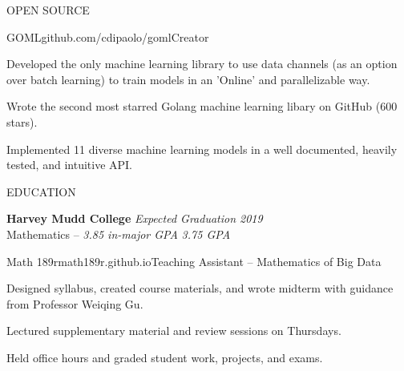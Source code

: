 \documentclass{resume} %
\begin{document}

\begin{rSection}{OPEN SOURCE}

\begin{rSubsection}{GOML}{\textsf{github.com/cdipaolo/goml}}{Creator}

\item Developed the only machine learning library to use data channels (as an option over batch learning) to train models in an 'Online' and parallelizable way.
\item Wrote the second most starred Golang machine learning libary on GitHub (600 stars).
\item Implemented 11 diverse machine learning models in a well documented, heavily tested, and intuitive API.
\end{rSubsection}

\end{rSection}



\begin{rSection}{EDUCATION}

{\bf Harvey Mudd College} \hfill {\em Expected Graduation 2019} \\ 
Mathematics -- {\em 3.85 in-major GPA} \hfill {\em 3.75 GPA}\\

\begin{rSubsection}{Math 189r}{\textsf{math189r.github.io}}{Teaching Assistant -- Mathematics of Big Data}

\item Designed syllabus, created course materials, and wrote midterm with guidance from Professor Weiqing Gu.
\item Lectured supplementary material and review sessions on Thursdays.
\item Held office hours and graded student work, projects, and exams.
\end{rSubsection}
\end{rSection}
\end{document}
